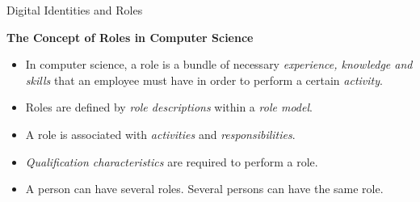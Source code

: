 \documentclass{beamer}
\newcommand{\ueberschrift}[1]{\begin{center}\bf #1\end{center}}
\begin{document}
\begin{frame}{Digital Identities and Roles}
  \ueberschrift{The Concept of Roles in Computer Science}
  
\begin{itemize}
\item In computer science, a role is a bundle of necessary \emph{experience,
  knowledge and skills} that an employee must have in order to perform a
  certain \emph{activity}.
\item Roles are defined by \emph{role descriptions} within a \emph{role
  model}.
\item A role is associated with \emph{activities} and \emph{responsibilities}.
\item \emph{Qualification characteristics} are required to perform a role.
\item A person can have several roles. Several persons can have the same role.
\end{itemize}
\end{frame}
\end{document}
